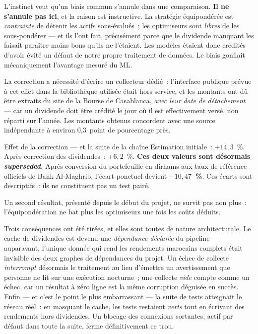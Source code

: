 L'instinct veut qu'un biais commun s'annule dans une comparaison. \textbf{Il ne
s'annule pas ici}, et la raison est instructive. La stratégie équipondérée est
\emph{contrainte} de détenir les actifs sous-évalués~; les optimiseurs sont
\emph{libres} de les sous-pondérer — et ils l'ont fait, précisément parce que le
dividende manquant les faisait paraître moins bons qu'ils ne l'étaient. Les
modèles étaient donc crédités d'avoir évité un défaut de notre propre traitement
de données. Le biais gonflait mécaniquement l'avantage mesuré du ML.

La correction a nécessité d'écrire un collecteur dédié~: l'interface publique
prévue à cet effet dans la bibliothèque utilisée était hors service, et les
montants ont dû être extraits du site de la Bourse de Casablanca, \emph{avec leur
date de détachement} — car un dividende doit être crédité le jour où il est
effectivement versé, non réparti sur l'année. Les montants obtenus concordent
avec une source indépendante à environ 0,3~point de pourcentage près.

\begin{resultatbox}{Effet de la correction — et la suite de la chaîne}
Estimation initiale~: $+14{,}3$~\%. Après correction des dividendes~:
$+6{,}2$~\%. \textbf{Ces deux valeurs sont désormais \emph{superseded}.} Après
conversion du portefeuille en dirhams aux taux de référence officiels de Bank
Al-Maghrib, l'écart ponctuel devient \textbf{$-10{,}47$~\%}. Ces écarts sont
descriptifs~: ils ne constituent pas un test pairé.

Un second résultat, présenté depuis le début du projet, ne survit pas non plus~:
l'équipondération ne bat plus les optimiseurs une fois les coûts déduits.
\end{resultatbox}

Trois conséquences ont été tirées, et elles sont toutes de nature architecturale.
Le cache de dividendes est devenu une \emph{dépendance déclarée} du pipeline —
auparavant, l'unique donnée qui rend les rendements marocains complets était
invisible des deux graphes de dépendances du projet. Un échec de collecte
\emph{interrompt} désormais le traitement au lieu d'émettre un avertissement que
personne ne lit sur une exécution nocturne~; une collecte \emph{vide} compte comme
un échec, car un résultat à zéro ligne est la même corruption déguisée en succès.
Enfin — et c'est le point le plus embarrassant — la suite de tests atteignait le
réseau réel~: en masquant le cache, les tests restaient \emph{verts} tout en
écrivant des rendements hors dividendes. Un blocage des connexions sortantes,
actif par défaut dans toute la suite, ferme définitivement ce trou.

